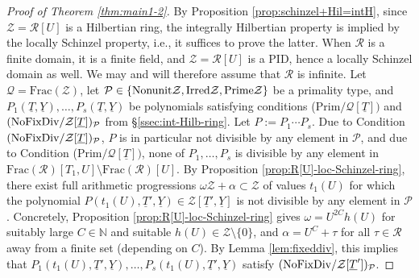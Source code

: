 \documentclass[11pt,a4paper,reqno]{amsart}
\theoremstyle{definition}
\begin{document}
\begin{proof}[Proof of Theorem \ref{thm:main1-2}]
By Proposition \ref{prop:schinzel+Hil=intH}, since $\mathcal{Z}=\mathcal{R}[U]$ is a Hilbertian ring, the integrally Hilbertian property is implied by the locally Schinzel property, i.e., it suffices to prove the latter.
 When ${\mathcal R}$ is a finite domain, it is a finite field, and ${\mathcal Z}={\mathcal R}[U]$ is a PID, hence a locally Schinzel domain as well. We may and will therefore assume that $\mathcal{R}$ is infinite. Let $\mathcal{Q}=\textrm{Frac}(\mathcal{Z})$, let $\mathcal{P}\in \{\rm{Nonunit} \mathcal{Z}, \rm{Irred} \mathcal{Z}, \rm{Prime} \mathcal{Z}\}$ be a primality type, and $P_1(\underline T, \underline Y), \dots, P_s(\underline T,\underline Y)$ be polynomials satisfying conditions {\rm (Prim}$/{\mathcal Q}[\underline T])$ and $\hbox{\rm (NoFixDiv}/{\mathcal Z}[\underline T])_{\mathcal P}$ from \S \ref{ssec:int-Hilb-ring}. Let $P:=P_1\cdots P_s$. Due to Condition $\hbox{\rm (NoFixDiv}/{\mathcal Z}[\underline T])_{\mathcal P}$, $P$ is in particular not divisible by any element in $\mathcal{P}$, and due to Condition {\rm (Prim}$/{\mathcal Q}[\underline T])$, none of $P_1,\ldots, P_s$ is divisible by any element in $\textrm{Frac}(\mathcal{R})[T_1,U] \setminus \textrm{Frac}(\mathcal{R})[U]$. 
 By Proposition \ref{prop:R[U]-loc-Schinzel-ring}, 
 there exist full arithmetic progressions 
 $\omega \mathcal{Z} + \alpha \subset\mathcal{Z}$
 of values $t_1(U)$ for which
 the polynomial $P(t_1(U), \underline{T}',\underline{Y})\in \mathcal{Z}[\underline T', \underline{Y}]$ is not divisible by any element in $\mathcal{P}$. 
 Concretely, Proposition \ref{prop:R[U]-loc-Schinzel-ring} gives $\omega = U^{2C}h(U)$ for suitably large $C\in \mathbb{N}$ and suitable $h(U)\in \mathcal{Z}\setminus \{0\}$, and $\alpha = U^C + \tau$ for all $\tau\in \mathcal{R}$ away from a finite set (depending on $C$). 
 By Lemma \ref{lem:fixeddiv}, this implies that $P_1(t_1(U),\underline{T}',\underline{Y}),\dots, P_s(t_1(U), \underline{T}',\underline{Y})$ satisfy $\hbox{\rm (NoFixDiv}/{\mathcal Z}[\underline T'])_{\mathcal P}$.



\end{proof}
\end{document}

